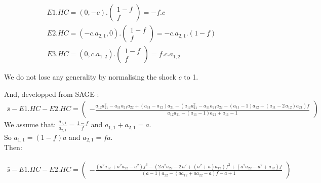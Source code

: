\documentclass[11pt,a4paper]{article}
\begin{document}
\begin{gather*}
E1.HC = \left(0,-c\right).\left(\begin{matrix}1-f\\f\end{matrix}\right)=-f.c
\\
E2.HC=\left(-c.a_{2,1},0\right).\left(\begin{matrix}1-f\\f\end{matrix}\right)=-c.a_{2,1}.\left(1-f\right)
\\ 
E3.HC=\left(0,c.a_{1,2}\right).\left(\begin{matrix}1-f\\f\end{matrix}\right)=f.c.a_{1,2}
\end{gather*}

We do not lose any generality by normalising the shock $c$ to 1. 

And, developped from SAGE :
\begin{gather}
\bar{s}-E1.HC-E2.HC=\left(\begin{array}{r}
-\frac{a_{12} a_{21}^{2} - a_{11} a_{21} a_{22} + {\left(a_{11} - a_{12}\right)} a_{21} - {\left(a_{12} a_{21}^{2} - a_{11} a_{21} a_{22} - {\left(a_{11} - 1\right)} a_{12} + {\left(a_{11} - 2 \, a_{12}\right)} a_{21}\right)} f}{a_{12} a_{21} - {\left(a_{11} - 1\right)} a_{22} + a_{11} - 1}
\end{array}\right)
\end{gather}
We assume that:
$\frac{a_{1,1}}{a_{2,1}}=\frac{1-f}{f}$ and $a_{1,1}+a_{2,1}=a$. \\ 
So
$a_{1,1}=(1-f)a$ and $a_{2,1}=fa$. \\

Then:

\begin{gather}
\bar{s}-E1.HC-E2.HC=\left(\begin{array}{r}
-\frac{{\left(a^{2} a_{12} + a^{2} a_{22} - a^{2}\right)} f^{3} - {\left(2 \, a^{2} a_{22} - 2 \, a^{2} + {\left(a^{2} + a\right)} a_{12}\right)} f^{2} + {\left(a^{2} a_{22} - a^{2} + a_{12}\right)} f}{{\left(a - 1\right)} a_{22} - {\left(a a_{12} + a a_{22} - a\right)} f - a + 1}
\end{array}\right)
\end{gather}
\end{document}
